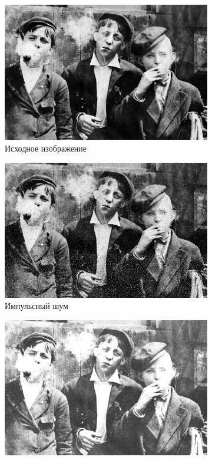 \begin{figure}[ht!] 
  \centering
  \begin{subfigure}[b]{0.5\linewidth}
      \centering
      \includegraphics[width=0.95\linewidth]{../lewis-hine-taschen-main-3.jpg} 
      \caption{Исходное изображение} 
      \vspace{4ex}
  \end{subfigure}%
  \begin{subfigure}[b]{0.5\linewidth}
    \centering
    \includegraphics[width=0.95\linewidth]{../Adaptive_Median_Filter/Adaptive_Median_Impulse_noise_k=5.jpg} 
    \caption{Импульсный шум} 
    \vspace{4ex}
  \end{subfigure}
  \begin{subfigure}[b]{0.5\linewidth}
    \centering
    \includegraphics[width=0.95\linewidth]{../Adaptive_Median_Filter/Adaptive_Median_Additive_noise_k=5.jpg} 

\end{subfigure}
\end{figure}
